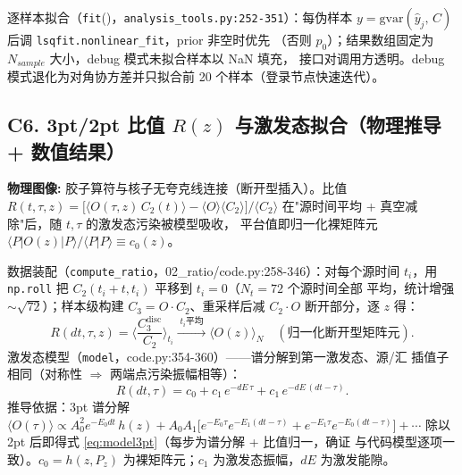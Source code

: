 \documentclass[UTF8]{ctexart}
\begin{document}
逐样本拟合（\texttt{\nolinkurl{fit}}()，\texttt{\nolinkurl{analysis_tools.py:252-351}}）：每伪样本
$y=\text{gvar}(\hat y_j,\,C)$ 后调 \texttt{\nolinkurl{lsqfit.nonlinear_fit}}，prior 非空时优先
（否则 $p_0$）；结果数组固定为 $N_{sample}$ 大小，debug 模式未拟合样本以 NaN 填充，
接口对调用方透明。debug 模式退化为对角协方差并只拟合前 20 个样本（登录节点快速迭代）。




\subsection{C6. 3pt/2pt 比值 $R(z)$ 与激发态拟合（物理推导 + 数值结果）}

\begin{physbox}
\textbf{物理图像:} 胶子算符与核子无夸克线连接（断开型插入）。比值
$R(t,\tau,z)=\big[\langle O(\tau,z)\,C_2(t)\rangle-\langle O\rangle\langle C_2\rangle\big]/
\langle C_2\rangle$ 在"源时间平均 + 真空减除"后，随 $t,\tau$ 的激发态污染被模型吸收，
平台值即归一化裸矩阵元 $\langle P|O(z)|P\rangle/\langle P|P\rangle\equiv c_0(z)$。
\end{physbox}

数据装配（\texttt{\nolinkurl{compute_ratio}}，02\_ratio/code.py:258-346）：对每个源时间
$t_i$，用 \texttt{np.roll} 把 $C_2(t_i{+}t,t_i)$ 平移到 $t_i=0$（$N_t=72$ 个源时间全部
平均，统计增强 $\sim\sqrt{72}$）；样本级构建 $C_3=O\cdot C_2$、重采样后减 $C_2\cdot O$
断开部分，逐 $z$ 得：
\begin{equation}\label{eq:ratio}
R(dt,\tau,z)=\Big\langle \frac{C_3^{\text{disc}}}{C_2}\Big\rangle_{t_i}
\xrightarrow{\;t_i\text{平均}\;}\langle O(z)\rangle_{N}
\quad(\text{归一化断开型矩阵元}).
\end{equation}
激发态模型（\texttt{\nolinkurl{model}}，code.py:354-360）——谱分解到第一激发态、源/汇
插值子相同（对称性 $\Rightarrow$ 两端点污染振幅相等）：
\begin{equation}\label{eq:model3pt}
R(dt,\tau)=c_0+c_1\,e^{-dE\,\tau}+c_1\,e^{-dE\,(dt-\tau)}.
\end{equation}
推导依据：3pt 谱分解 $\langle O(\tau)\rangle\propto A_0^2e^{-E_0 dt}\,h(z)
+A_0A_1\big[e^{-E_0\tau}e^{-E_1(dt-\tau)}+e^{-E_1\tau}e^{-E_0(dt-\tau)}\big]+\cdots$
除以 2pt 后即得式 \eqref{eq:model3pt}（每步为谱分解 + 比值归一，\textcolor{accent}{确证}
与代码模型逐项一致）。$c_0=h(z,P_z)$ 为裸矩阵元；$c_1$ 为激发态振幅，$dE$ 为激发能隙。
\end{document}

